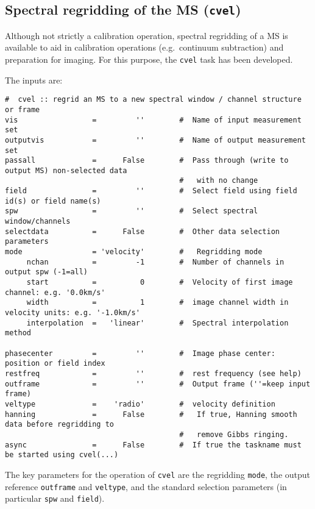 \subsection{Spectral regridding of the MS ({\tt cvel})}
\label{section:cal.other.cvel}

Although not strictly a calibration operation, spectral regridding
of a MS is available to aid in calibration operations (e.g.\ continuum
subtraction) and preparation for imaging.  For this purpose, the
{\tt cvel} task has been developed.  

The inputs are:
\small
\begin{verbatim}
#  cvel :: regrid an MS to a new spectral window / channel structure or frame
vis                 =         ''        #  Name of input measurement set
outputvis           =         ''        #  Name of output measurement set
passall             =      False        #  Pass through (write to output MS) non-selected data
                                        #   with no change
field               =         ''        #  Select field using field id(s) or field name(s)
spw                 =         ''        #  Select spectral window/channels
selectdata          =      False        #  Other data selection parameters
mode                = 'velocity'        #   Regridding mode
     nchan          =         -1        #  Number of channels in output spw (-1=all)
     start          =          0        #  Velocity of first image channel: e.g. '0.0km/s'
     width          =          1        #  image channel width in velocity units: e.g. '-1.0km/s'
     interpolation  =   'linear'        #  Spectral interpolation method

phasecenter         =         ''        #  Image phase center: position or field index
restfreq            =         ''        #  rest frequency (see help)
outframe            =         ''        #  Output frame (''=keep input frame)
veltype             =    'radio'        #  velocity definition
hanning             =      False        #   If true, Hanning smooth data before regridding to
                                        #   remove Gibbs ringing.
async               =      False        #  If true the taskname must be started using cvel(...)

\end{verbatim}
\normalsize

The key parameters for the operation of {\tt cvel} are the regridding
{\tt mode}, the output reference {\tt outframe} and {\tt veltype}, and
the standard selection parameters (in particular {\tt spw} and {\tt field}).

